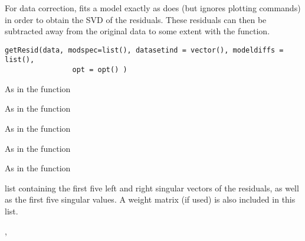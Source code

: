 \begin{Description}\relax
For data correction, fits a model exactly as does 
 (but ignores 
plotting commands) in order to obtain the SVD of the residuals.  These 
residuals can then be subtracted away from the original data to some
extent with the  function.
\end{Description}
\begin{Usage}
\begin{verbatim}
getResid(data, modspec=list(), datasetind = vector(), modeldiffs = list(), 
                opt = opt() )
\end{verbatim}
\end{Usage}
\begin{Arguments}
\begin{ldescription}
\item[\code{data}] As in the  function 
\item[\code{modspec}] As in the  function
\item[\code{datasetind}] As in the  function
\item[\code{modeldiffs}] As in the  function
\item[\code{opt}] As in the  function
\end{ldescription}
\end{Arguments}
\begin{Value}
list containing the first five left and right singular vectors of the 
residuals, as well as the first five singular values.  A weight matrix 
(if used) is also included in this list.
\end{Value}
\begin{SeeAlso}\relax
{}, 
\end{SeeAlso}

